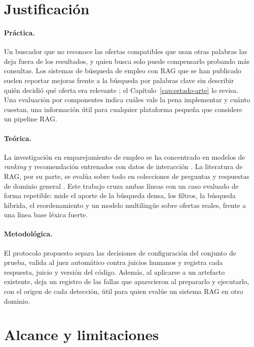\section{Justificación}

\paragraph{Práctica.} Un buscador que no reconoce las ofertas compatibles que usan otras palabras las deja fuera de los resultados, y quien busca solo puede compensarlo probando más consultas. Los sistemas de búsqueda de empleo con RAG que se han publicado suelen reportar mejoras frente a la búsqueda por palabras clave sin describir quién decidió qué oferta era relevante \citep{Yoruk2025,Srihari2025JobSphere}; el Capítulo~\ref{cap:estado-arte} lo revisa. Una evaluación por componentes indica cuáles vale la pena implementar y cuánto cuestan, una información útil para cualquier plataforma pequeña que considere un pipeline RAG.

\paragraph{Teórica.} La investigación en emparejamiento de empleo se ha concentrado en modelos de \textit{ranking} y recomendación entrenados con datos de interacción \citep{HaThuc2017,Shen2024,Bocharova2023}. La literatura de RAG, por su parte, se evalúa sobre todo en colecciones de preguntas y respuestas de dominio general \citep{Gao2023}. Este trabajo cruza ambas líneas con un caso evaluado de forma repetible: mide el aporte de la búsqueda densa, los filtros, la búsqueda híbrida, el reordenamiento y un modelo multilingüe sobre ofertas reales, frente a una línea base léxica fuerte.

\paragraph{Metodológica.} El protocolo propuesto separa las decisiones de configuración del conjunto de prueba, valida al juez automático contra juicios humanos y registra cada respuesta, juicio y versión del código. Además, al aplicarse a un artefacto existente, deja un registro de las fallas que aparecieron al prepararlo y ejecutarlo, con el origen de cada detección, útil para quien evalúe un sistema RAG en otro dominio.

\section{Alcance y limitaciones}
\label{sec:alcance}

